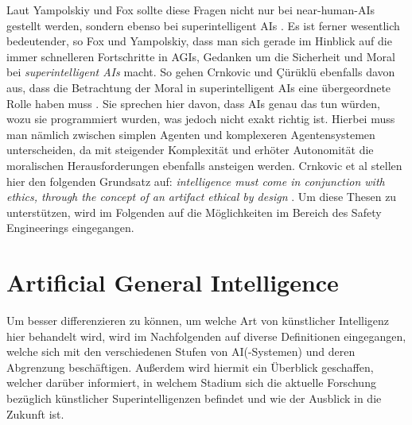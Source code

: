             Laut Yampolskiy und Fox sollte diese Fragen nicht nur bei near-human-AIs gestellt werden, sondern ebenso bei
            superintelligent AIs \cite[s. 2]{yampolskiy2013safety}. Es ist ferner wesentlich bedeutender, so Fox und
            Yampolskiy, dass man sich gerade im Hinblick auf die immer schnelleren Fortschritte in AGIs, Gedanken um die
            Sicherheit und Moral bei \textit{superintelligent AIs} macht. So gehen Crnkovic und {\c{C}}{\"u}r{\"u}kl{\"u}
            ebenfalls davon aus, dass die Betrachtung der Moral in superintelligent AIs eine übergeordnete Rolle haben
            muss \cite*{crnkovic2012robots}. Sie sprechen hier davon, dass AIs genau das tun würden, wozu sie programmiert
            wurden, was jedoch nicht exakt richtig ist. Hierbei muss man nämlich zwischen simplen Agenten und komplexeren
            Agentensystemen unterscheiden, da mit steigender Komplexität und erhöter Autonomität die moralischen
            Herausforderungen ebenfalls ansteigen werden. Crnkovic et al stellen hier den folgenden Grundsatz auf:
            \textit{intelligence must come in conjunction with ethics, through the concept of an artifact ethical by design}
            \cite{crnkovic2012robots}. Um diese Thesen zu unterstützen, wird im Folgenden auf die Möglichkeiten im Bereich
            des Safety Engineerings eingegangen.


    \section{Artificial General Intelligence}
        Um besser differenzieren zu können, um welche Art von künstlicher Intelligenz hier behandelt wird, wird im
        Nachfolgenden auf diverse Definitionen eingegangen, welche sich mit den verschiedenen Stufen von AI(-Systemen)
        und deren Abgrenzung beschäftigen. Außerdem wird hiermit ein Überblick geschaffen, welcher darüber informiert,
        in welchem Stadium sich die aktuelle Forschung bezüglich künstlicher Superintelligenzen befindet und wie der
        Ausblick in die Zukunft ist.

